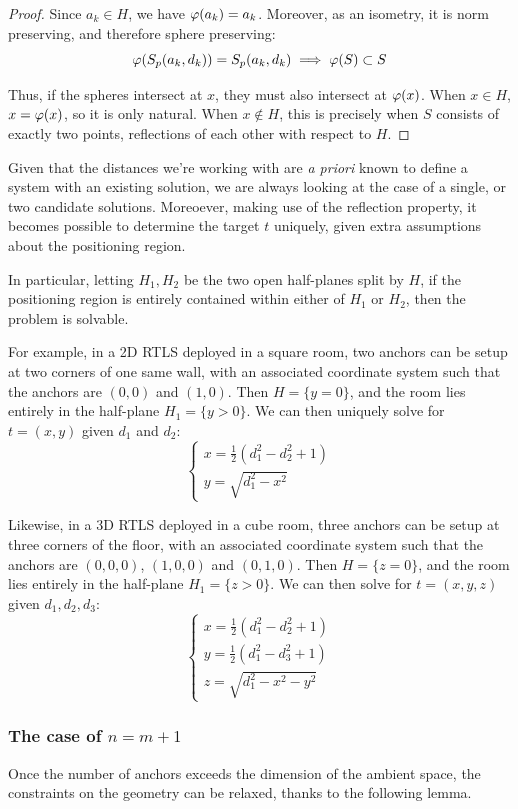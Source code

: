 \begin{proof}
Since $a_k\in H$, we have $\varphi(a_k)=a_k$. Moreover, as an isometry, it is norm preserving, and therefore sphere preserving:
\[
    \varphi(S_p(a_k,d_k)) = S_p(a_k,d_k) \implies \varphi(S) \subset S
\]

Thus, if the spheres intersect at $x$, they must also intersect at $\varphi(x)$. When $x\in H$, $x=\varphi(x)$, so it is only natural. When $x\notin H$, this is precisely when $S$ consists of exactly two points, reflections of each other with respect to $H$.
\end{proof}

Given that the distances we're working with are \textit{a priori} known to define a system with an existing solution, we are always looking at the case of a single, or two candidate solutions. Moreoever, making use of the reflection property, it becomes possible to determine the target $t$ uniquely, given extra assumptions about the positioning region.

In particular, letting $H_1,H_2$ be the two open half-planes split by $H$, if the positioning region is entirely contained within either of $H_1$ or $H_2$, then the problem is solvable.

For example, in a 2D RTLS deployed in a square room, two anchors can be setup at two corners of one same wall, with an associated coordinate system such that the anchors are $(0,0)$ and $(1,0)$. Then $H=\{y=0\}$, and the room lies entirely in the half-plane $H_1=\{y>0\}$. We can then uniquely solve for $t=(x,y)$ given $d_1$ and $d_2$:
\[
\begin{cases}
    x = \frac{1}{2}(d_1^2 - d_2^2 + 1) \\
    y = \sqrt{d_1^2 - x^2}
\end{cases}
\]

Likewise, in a 3D RTLS deployed in a cube room, three anchors can be setup at three corners of the floor, with an associated coordinate system such that the anchors are $(0,0,0)$, $(1,0,0)$ and $(0,1,0)$. Then $H=\{z=0\}$, and the room lies entirely in the half-plane $H_1=\{z > 0\}$. We can then solve for $t=(x,y,z)$ given $d_1, d_2, d_3$:
\[
\begin{cases}
    x = \frac{1}{2}(d_1^2 - d_2^2 + 1) \\
    y = \frac{1}{2}(d_1^2 - d_3^2 + 1) \\
    z = \sqrt{d_1^2 - x^2 - y^2}
\end{cases}
\]

\subsubsection{The case of $n=m+1$}
Once the number of anchors exceeds the dimension of the ambient space, the constraints on the geometry can be relaxed, thanks to the following lemma.

